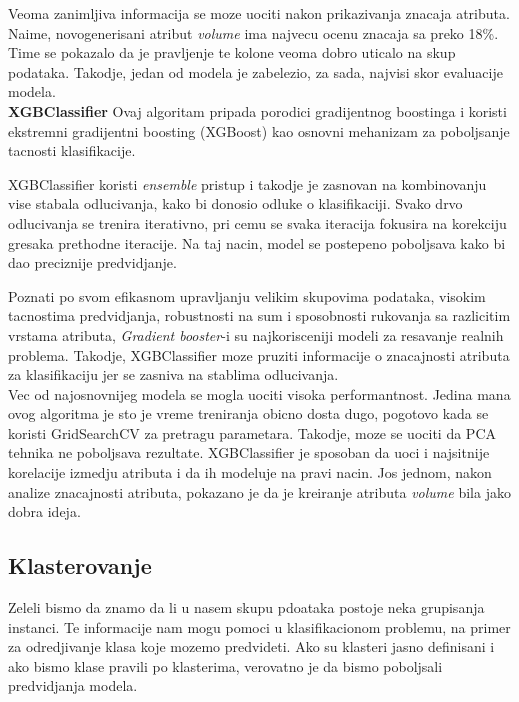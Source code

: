 \documentclass[10pt]{article}
\begin{document}
Veoma zanimljiva informacija se moze uociti nakon prikazivanja znacaja atributa. Naime, novogenerisani atribut \textit{volume} ima najvecu ocenu znacaja sa preko 18\%. Time se pokazalo da je pravljenje te kolone veoma dobro uticalo na skup podataka. Takodje, jedan od modela je zabelezio, za sada, najvisi skor evaluacije modela.\\

\textbf{XGBClassifier}
Ovaj algoritam pripada porodici gradijentnog boostinga i koristi ekstremni gradijentni boosting (XGBoost) kao osnovni mehanizam za poboljsanje tacnosti klasifikacije.

XGBClassifier koristi \textit{ensemble} pristup i takodje je zasnovan na kombinovanju vise stabala odlucivanja, kako bi donosio odluke o klasifikaciji. Svako drvo odlucivanja se trenira iterativno, pri cemu se svaka iteracija fokusira na korekciju gresaka prethodne iteracije. Na taj nacin, model se postepeno poboljsava kako bi dao preciznije predvidjanje.

Poznati po svom efikasnom upravljanju velikim skupovima podataka, visokim tacnostima predvidjanja, robustnosti na sum i sposobnosti rukovanja sa razlicitim vrstama atributa, \textit{Gradient booster}-i su najkorisceniji modeli za resavanje realnih problema. Takodje, XGBClassifier moze pruziti informacije o znacajnosti atributa za klasifikaciju jer se zasniva na stablima odlucivanja.\\


Vec od najosnovnijeg modela se mogla uociti visoka performantnost. Jedina mana ovog algoritma je sto je vreme treniranja obicno dosta dugo, pogotovo kada se koristi GridSearchCV za pretragu parametara. Takodje, moze se uociti da PCA tehnika ne poboljsava rezultate. XGBClassifier je sposoban da uoci i najsitnije korelacije izmedju atributa i da ih modeluje na pravi nacin. Jos jednom, nakon analize znacajnosti atributa, pokazano je da je kreiranje atributa \textit{volume} bila jako dobra ideja.


\newpage
\subsection{Klasterovanje}
Zeleli bismo da znamo da li u nasem skupu pdoataka postoje neka grupisanja instanci. Te informacije nam mogu pomoci u klasifikacionom problemu, na primer za odredjivanje klasa koje mozemo predvideti. Ako su klasteri jasno definisani i ako bismo klase pravili po klasterima, verovatno je da bismo poboljsali predvidjanja modela.
\end{document}
